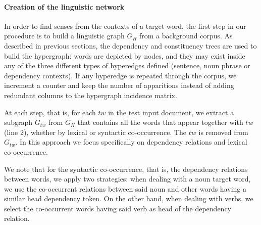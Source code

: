 \paragraph{Creation of the linguistic network}


In order to find senses from the contexts of a target word, the first step in our procedure is to build a linguistic graph $G_H$ from a background corpus. As described in previous sections, the dependency and constituency trees are used to build the hypergraph: words are depicted by nodes, and they may exist inside any of the three different types of hyperedges defined (sentence,  noun phrase or dependency contexts). If any  hyperedge is repeated through the corpus, we increment a counter and keep the number of apparitions instead of adding redundant columns to the hypergraph incidence matrix.

At each step, that is, for each $tw$ in the test input document, we extract a subgraph $G_{tw}$ from $G_H$ that contains all the words that appear together with $tw$ (line 2), whether by lexical or syntactic co-occurrence. The $tw$ is removed from $G_{tw}$. In this approach we focus specifically on dependency relations and lexical co-occurrence. 

We note that for the syntactic co-occurrence, that is, the dependency relations between words, we apply two strategies: when dealing with a noun target word, we use the co-occurrent relations between said noun and other words having a similar head dependency token. On the other hand, when dealing with verbs, we select the co-occurrent words having said verb as head of the dependency relation.  

